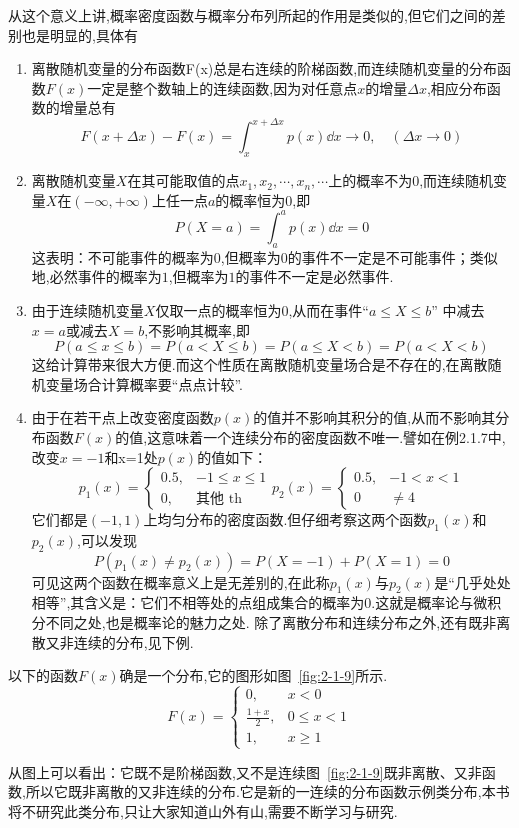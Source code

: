 从这个意义上讲,概率密度函数与概率分布列所起的作用是类似的,但它们之间的差别也是明显的,具体有

\begin{enumerate}
	\item 离散随机变量的分布函数F(x)总是右连续的阶梯函数,而连续随机变量的分布函数$ F(x) $一定是整个数轴上的连续函数,因为对任意点$ x $的增量$\Delta x$,相应分布函数的增量总有
	\[
	F(x+\Delta x)-F(x)=\int_{x}^{x+\Delta x} p(x) \dd  x \longrightarrow 0, \quad(\Delta x \rightarrow 0)
	\]
	\item 离散随机变量$ X $在其可能取值的点$x_{1}, x_{2}, \cdots, x_{n}, \cdots$上的概率不为$ 0 $,而连续随机变量$ X $在$(-\infty,+\infty)$上任一点$ a $的概率恒为$ 0 $,即
	\[
	P(X=a)=\int_{a}^{a} p(x) \dd  x=0
	\]
	这表明：不可能事件的概率为$ 0 $,但概率为0的事件不一定是不可能事件；类似地,必然事件的概率为$ 1 $,但概率为$ 1 $的事件不一定是必然事件.
	\item 由于连续随机变量$ X $仅取一点的概率恒为$ 0 $,从而在事件“$a \leqslant X \leqslant b$”
	中减去$ x=a $或减去$ X=b $,不影响其概率,即
	\[
	P(a \leqslant x \leqslant b)=P(a<X \leqslant b)=P(a \leqslant X<b)=P(a<X<b)
	\]
	这给计算带来很大方便.而这个性质在离散随机变量场合是不存在的,在离散随机变量场合计算概率要“点点计较”.
	\item 由于在若干点上改变密度函数$ p(x) $的值并不影响其积分的值,从而不影响其分布函数$ F(x) $的值,这意味着一个连续分布的密度函数不唯一.譬如在例2.1.7中,改变$ x=-1 $和x=1处$ p(x) $的值如下：
	\[
	p_{1}(x)=\left\{\begin{array}{ll}{0.5,} & {-1 \leqslant x \leqslant 1} \\ {0,} & {\text{其他} \text { th }}\end{array}\right. p_{2}(x)=\left\{\begin{array}{ll}{0.5,} & {-1<x<1} \\ {0} & { \neq 4}\end{array}\right.
	\]
	它们都是$ (-1,1) $上均匀分布的密度函数.但仔细考察这两个函数$ p_1(x) $和$ p_2(x) $,可以发现
	\[
	P\left(p_{1}(x) \neq p_{2}(x)\right)=P(X=-1)+P(X=1)=0
	\]
	可见这两个函数在概率意义上是无差别的,在此称$ p_1(x) $与$ p_2(x) $是“几乎处处相等”,其含义是：它们不相等处的点组成集合的概率为$ 0 $.这就是概率论与微积分不同之处,也是概率论的魅力之处.
	除了离散分布和连续分布之外,还有既非离散又非连续的分布,见下例.
\end{enumerate}

\begin{example}
	以下的函数$ F(x) $确是一个分布,它的图形如图~\ref{fig:2-1-9}所示.
	\[
	F(x)=\left\{\begin{array}{ll}{0,} & {x<0} \\ {\frac{1+x}{2},} & {0 \leqslant x<1} \\ {1,} & {x \geqslant 1}\end{array}\right.
	\]
	
	从图上可以看出：它既不是阶梯函数,又不是连续图~\ref{fig:2-1-9}既非离散、又非函数,所以它既非离散的又非连续的分布.它是新的一连续的分布函数示例类分布,本书将不研究此类分布,只让大家知道山外有山,需要不断学习与研究.
\end{example}

